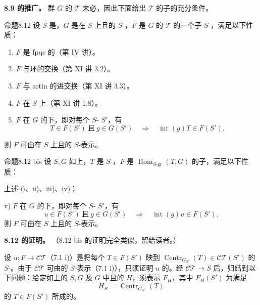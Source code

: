 \textbf{8.9 的推广。} 群 $G$ 的 $\mathcal T$ 未必，因此下面给出 $\mathcal T$ 的子的充分条件。
\begin{SGAresult}{命题}{8.12}
设 $S$ 是，$G$ 是在 $S$ 上且的 $S$-，$F$ 是 $G$ 的 $\mathcal T$ 的一个子 $S$-，满足以下性质：
\begin{enumerate}
\item[i)] $F$ 是 fpqc 的（第 IV 讲）。
\item[ii)] $F$ 与环的交换（第 XI 讲 3.2）。
\item[iii)] $F$ 与 artin 的进交换（第 XI 讲 3.3）。
\item[iv)] $F$ 在 $S$ 上（第 XI 讲 1.8）。
\item[v)] $F$ 在 $G$ 的下，即对每个 $S$- $S'$，有
\[T\in F(S')\ \text{且}\ g\in G(S')\quad\Longrightarrow\quad\operatorname{int}(g)T\in F(S').\]
\end{enumerate}
则 $F$ 可由在 $S$ 上且的 $S$-表示。
\end{SGAresult}
\begin{SGAresult}{命题}{8.12 bis}
设 $S,G$ 如上，$T$ 是 $S$-，$F$ 是 $\operatorname{Hom}_{S\text{-}\mathrm{gr}}(T,G)$ 的子，满足以下性质：

上述 i)、ii)、iii)、iv)；

v) $F$ 在 $G$ 的下，即对每个 $S$- $S'$，有
\[u\in F(S')\ \text{且}\ g\in G(S')\quad\Longrightarrow\quad\operatorname{int}(g)u\in F(S').\]
则 $F$ 可由在 $S$ 上且的 $S$-表示。
\end{SGAresult}
\textbf{8.12 的证明。} （8.12 bis 的证明完全类似，留给读者。）

设 $u:F\to\mathcal{CT}$（7.1 i)）是将每个 $T\in F(S')$ 映到 $\operatorname{Centr}_{G_{S'}}(T)\in\mathcal{CT}(S')$ 的 $S$-。由于 $\mathcal{CT}$ 可由的 $S$-表示（7.1 i)），只须证明 $u$ 的。经 $\mathcal{CT}\to S$ 后，归结到以下问题：给定如上的 $S,G$ 及 $G$ 中且的 $H$，须表示 $F_H$，其中 $F_H(S')$ 为满足
\[H_{S'}=\operatorname{Centr}_{G_{S'}}(T)\]
的 $T\in F(S')$ 所成的。

